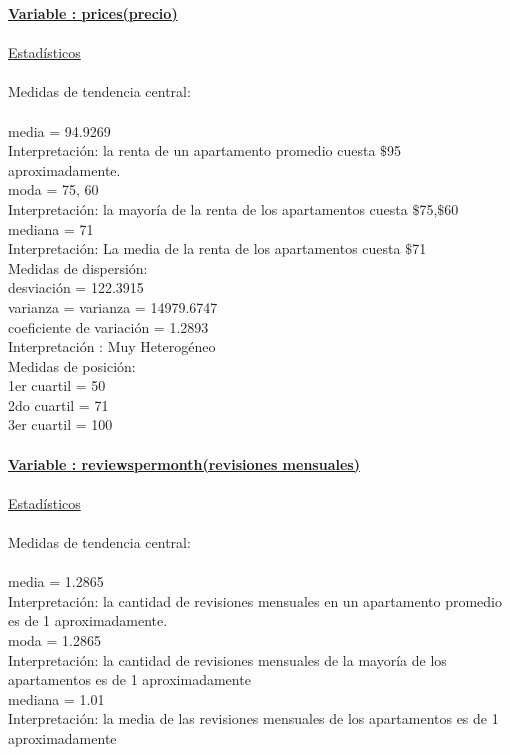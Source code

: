 \documentclass[a4paper,12pt]{article}
\begin{document}
\begin{enumerate}
\textbf{\underline{Variable : prices(precio)}}\\\\
\underline{Estad\'isticos}\\\\
Medidas de tendencia central:\\\\
media = 94.9269\\
Interpretaci\'on: la renta de un apartamento promedio cuesta $\$$95 aproximadamente.\\
moda = 75, 60\\
Interpretaci\'on: la mayor\'ia de la renta de los apartamentos cuesta $\$$75,$\$$60\\
mediana = 71\\
Interpretaci\'on: La media de la renta de los apartamentos cuesta $\$$71\\

Medidas de dispersi\'on:\\
desviaci\'on = 122.3915\\
varianza = varianza = 14979.6747\\
coeficiente de variaci\'on = 1.2893\\
Interpretaci\'on : Muy Heterog\'eneo\\

Medidas de posici\'on:\\
1er cuartil = 50\\
2do cuartil = 71\\
3er cuartil = 100\\\\

\textbf{\underline{Variable : reviews\textunderscore per\textunderscore month(revisiones mensuales)}}\\\\
\underline{Estad\'isticos}\\\\
Medidas de tendencia central:\\\\
media = 1.2865\\
Interpretaci\'on: la cantidad de revisiones mensuales en un apartamento promedio es de 1 aproximadamente.\\
moda = 1.2865\\
Interpretaci\'on: la cantidad de revisiones mensuales de la mayor\'ia de los apartamentos es de 1 aproximadamente\\
mediana = 1.01\\
Interpretaci\'on: la media de las revisiones mensuales de los apartamentos es de 1 aproximadamente\\


\end{enumerate}
\end{document}
